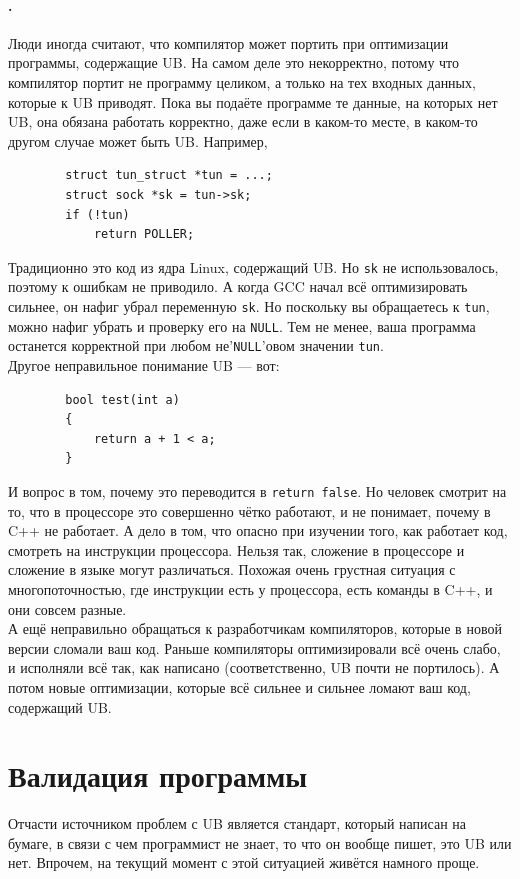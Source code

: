 \documentclass{article}
\begin{document}
    \paragraph{.}
    Люди иногда считают, что компилятор может портить при оптимизации программы, содержащие UB. На самом деле это некорректно, потому что компилятор портит не программу целиком, а только на тех входных данных, которые к UB приводят. Пока вы подаёте программе те данные, на которых нет UB, она обязана работать корректно, даже если в каком-то месте, в каком-то другом случае может быть UB. Например,
    \begin{verbatim}
        struct tun_struct *tun = ...;
        struct sock *sk = tun->sk;
        if (!tun)
            return POLLER;
    \end{verbatim}
    Традиционно это код из ядра Linux, содержащий UB. Но \texttt{sk} не использовалось, поэтому к ошибкам не приводило. А когда GCC начал всё оптимизировать сильнее, он нафиг убрал переменную \texttt{sk}. Но поскольку вы обращаетесь к \texttt{tun}, можно нафиг убрать и проверку его на \texttt{NULL}. Тем не менее, ваша программа останется корректной при любом не'\texttt{NULL}'овом значении \texttt{tun}.\\
    Другое неправильное понимание UB --- вот:
    \begin{verbatim}
        bool test(int a)
        {
            return a + 1 < a;
        }
    \end{verbatim}
    И вопрос в том, почему это переводится в \texttt{return false}. Но человек смотрит на то, что в процессоре это совершенно чётко работают, и не понимает, почему в C++ не работает. А дело в том, что опасно при изучении того, как работает код, смотреть на инструкции процессора. Нельзя так, сложение в процессоре и сложение в языке могут различаться. Похожая очень грустная ситуация с многопоточностью, где инструкции есть у процессора, есть команды в C++, и они совсем разные.\\
    А ещё неправильно обращаться к разработчикам компиляторов, которые в новой версии сломали ваш код. Раньше компиляторы оптимизировали всё очень слабо, и исполняли всё так, как написано (соответственно, UB почти не портилось). А потом новые оптимизации, которые всё сильнее и сильнее ломают ваш код, содержащий UB.
    \section{Валидация программы}
    Отчасти источником проблем с UB является стандарт, который написан на бумаге, в связи с чем программист не знает, то что он вообще пишет, это UB или нет. Впрочем, на текущий момент с этой ситуацией живётся намного проще.
\end{document}
